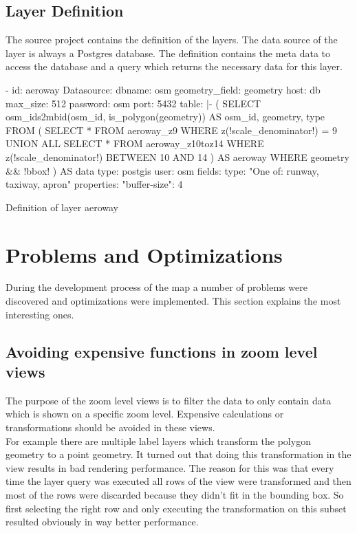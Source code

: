 \subsection{Layer Definition}

The source project contains the definition of the layers. The data source of the layer is always a Postgres database. The definition contains the meta data to access the database and a query which returns the necessary data for this layer. 

\begin{listing}[H]
\begin{yamlcode}
- id: aeroway
    Datasource: 
      dbname: osm
      geometry_field: geometry
      host: db
      max_size: 512
      password: osm
      port: 5432
      table: |-
        (
          SELECT osm_ids2mbid(osm_id, is_polygon(geometry)) AS osm_id, geometry, type
          FROM (
            SELECT *
            FROM aeroway_z9
            WHERE z(!scale_denominator!) = 9
            UNION ALL
            SELECT *
            FROM aeroway_z10toz14
            WHERE z(!scale_denominator!) BETWEEN 10 AND 14
          ) AS aeroway
          WHERE geometry && !bbox!
        ) AS data
      type: postgis
      user: osm
    fields: 
      type: "One of: runway, taxiway, apron"
    properties: 
      "buffer-size": 4
\end{yamlcode}
\caption{Definition of layer aeroway}
\label{definition_of_layer}
\end{listing}

\section{Problems and Optimizations}

During the development process of the map a number of problems were discovered and optimizations were implemented. This section explains the most interesting ones.

\subsection{Avoiding expensive functions in zoom level views}

The purpose of the zoom level views is to filter the data to only contain data which is shown on a specific zoom level. Expensive calculations or transformations should be avoided in these views.\\
For example there are multiple label layers which transform the polygon geometry to a point geometry. It turned out that doing this transformation in the view results in bad rendering performance. The reason for this was that every time the layer query was executed all rows of the view were transformed and then most of the rows were discarded because they didn't fit in the bounding box. So first selecting the right row and only executing the transformation on this subset resulted obviously in way better performance.

